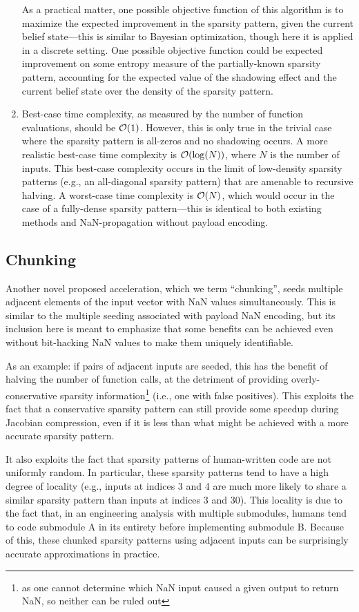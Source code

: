 \begin{enumerate}
    As a practical matter, one possible objective function of this algorithm is to maximize the expected improvement in the sparsity pattern, given the current belief state—this is similar to Bayesian optimization, though here it is applied in a discrete setting. One possible objective function could be expected improvement on some entropy measure of the partially-known sparsity pattern, accounting for the expected value of the shadowing effect and the current belief state over the density of the sparsity pattern.
    \item Best-case time complexity, as measured by the number of function evaluations, should be $\mathcal{O}(1)$. However, this is only true in the trivial case where the sparsity pattern is all-zeros and no shadowing occurs. A more realistic best-case time complexity is $\mathcal{O}(\log(N))$, where $N$ is the number of inputs. This best-case complexity occurs in the limit of low-density sparsity patterns (e.g., an all-diagonal sparsity pattern) that are amenable to recursive halving. A worst-case time complexity is $\mathcal{O}(N)$, which would occur in the case of a fully-dense sparsity pattern—this is identical to both existing methods and NaN-propagation without payload encoding.
\end{enumerate}

\subsection{Chunking}

Another novel proposed acceleration, which we term ``chunking'', seeds multiple adjacent elements of the input vector with NaN values simultaneously. This is similar to the multiple seeding associated with payload NaN encoding, but its inclusion here is meant to emphasize that some benefits can be achieved even without bit-hacking NaN values to make them uniquely identifiable.

As an example: if pairs of adjacent inputs are seeded, this has the benefit of halving the number of function calls, at the detriment of providing overly-conservative sparsity information\footnote{as one cannot determine which NaN input caused a given output to return NaN, so neither can be ruled out} (i.e., one with false positives). This exploits the fact that a conservative sparsity pattern can still provide some speedup during Jacobian compression, even if it is less than what might be achieved with a more accurate sparsity pattern.

It also exploits the fact that sparsity patterns of human-written code are not uniformly random. In particular, these sparsity patterns tend to have a high degree of locality (e.g., inputs at indices 3 and 4 are much more likely to share a similar sparsity pattern than inputs at indices 3 and 30). This locality is due to the fact that, in an engineering analysis with multiple submodules, humans tend to code submodule A in its entirety before implementing submodule B. Because of this, these chunked sparsity patterns using adjacent inputs can be surprisingly accurate approximations in practice.

